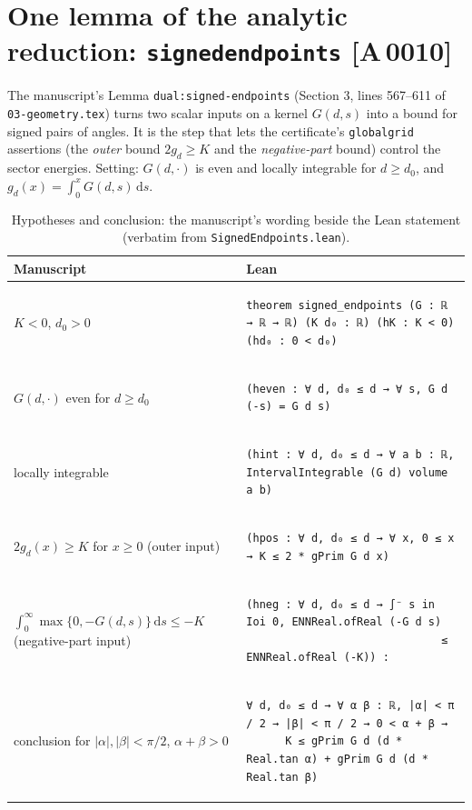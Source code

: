 \documentclass[10pt]{article}
\newcommand{\tg}[2]{\texorpdfstring{\textsf{[#1\,#2]}}{}}  %
\newcommand{\lean}[1]{\texttt{#1}}
\newcommand{\dd}{\,\mathrm{d}}
\renewcommand{\_}{\textunderscore\allowbreak}
\begin{document}
\section{One lemma of the analytic reduction: \lean{signed\_endpoints} \tg{A}{0010}}\label{sec:signed}
The manuscript's Lemma \texttt{dual:signed-endpoints} (Section 3, lines 567--611 of \texttt{03-geometry.tex}) turns two scalar inputs on a kernel $G(d,s)$ into a bound for signed pairs of angles. It is the step that lets the certificate's \lean{global\_grid} assertions (the \emph{outer} bound $2g_d\ge K$ and the \emph{negative-part} bound) control the sector energies. Setting: $G(d,\cdot)$ is even and locally integrable for $d\ge d_0$, and $g_d(x)=\int_0^xG(d,s)\dd s$.
\begin{table}[ht]\centering\small
\caption{Hypotheses and conclusion: the manuscript's wording beside the Lean statement (verbatim from \texttt{SignedEndpoints.lean}).}
\begin{tabular}{@{}p{4.6cm} p{11.7cm}@{}}\toprule
Manuscript & Lean\\\midrule
\vspace{-1.2ex}$K<0$, $d_0>0$ & \vspace{-1.2ex}\begin{lstlisting}[frame=none]
theorem signed_endpoints (G : ℝ → ℝ → ℝ) (K d₀ : ℝ) (hK : K < 0) (hd₀ : 0 < d₀)
\end{lstlisting}\\
$G(d,\cdot)$ even for $d\ge d_0$ & \vspace{-1.2ex}\begin{lstlisting}[frame=none]
    (heven : ∀ d, d₀ ≤ d → ∀ s, G d (-s) = G d s)
\end{lstlisting}\\
locally integrable & \vspace{-1.2ex}\begin{lstlisting}[frame=none]
    (hint : ∀ d, d₀ ≤ d → ∀ a b : ℝ, IntervalIntegrable (G d) volume a b)
\end{lstlisting}\\
$2g_d(x)\ge K$ for $x\ge0$ (outer input) & \vspace{-1.2ex}\begin{lstlisting}[frame=none]
    (hpos : ∀ d, d₀ ≤ d → ∀ x, 0 ≤ x → K ≤ 2 * gPrim G d x)
\end{lstlisting}\\
$\int_0^\infty\max\{0,-G(d,s)\}\dd s\le-K$ (negative-part input) & \vspace{-1.2ex}\begin{lstlisting}[frame=none]
    (hneg : ∀ d, d₀ ≤ d → ∫⁻ s in Ioi 0, ENNReal.ofReal (-G d s)
                              ≤ ENNReal.ofReal (-K)) :
\end{lstlisting}\\
conclusion for $|\alpha|,|\beta|<\pi/2$, $\alpha+\beta>0$ & \vspace{-1.2ex}\begin{lstlisting}[frame=none]
    ∀ d, d₀ ≤ d → ∀ α β : ℝ, |α| < π / 2 → |β| < π / 2 → 0 < α + β →
      K ≤ gPrim G d (d * Real.tan α) + gPrim G d (d * Real.tan β)
\end{lstlisting}\\\bottomrule
\end{tabular}
\end{table}
\end{document}
